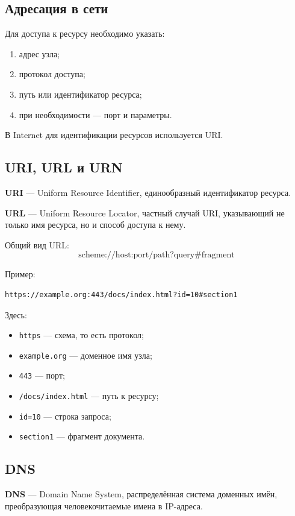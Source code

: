 \documentclass[12pt,a4paper]{article}
\begin{document}
\subsection{Адресация в сети}

Для доступа к ресурсу необходимо указать:
\begin{enumerate}
    \item адрес узла;
    \item протокол доступа;
    \item путь или идентификатор ресурса;
    \item при необходимости --- порт и параметры.
\end{enumerate}

В Internet для идентификации ресурсов используется URI.

\subsection{URI, URL и URN}

\textbf{URI} --- Uniform Resource Identifier, единообразный идентификатор ресурса.

\textbf{URL} --- Uniform Resource Locator, частный случай URI, указывающий не только имя ресурса, но и способ доступа к нему.

Общий вид URL:
\[
\text{scheme://host:port/path?query\#fragment}
\]

Пример:
\begin{lstlisting}
https://example.org:443/docs/index.html?id=10#section1
\end{lstlisting}

Здесь:
\begin{itemize}
    \item \texttt{https} --- схема, то есть протокол;
    \item \texttt{example.org} --- доменное имя узла;
    \item \texttt{443} --- порт;
    \item \texttt{/docs/index.html} --- путь к ресурсу;
    \item \texttt{id=10} --- строка запроса;
    \item \texttt{section1} --- фрагмент документа.
\end{itemize}

\subsection{DNS}

\textbf{DNS} --- Domain Name System, распределённая система доменных имён, преобразующая человекочитаемые имена в IP-адреса.
\end{document}
